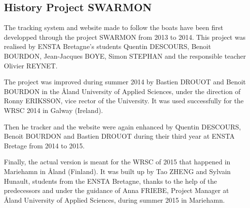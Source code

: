 \subsection{History Project SWARMON}
The tracking system and website made to follow the boats have been first developped through the project SWARMON from 2013 to 2014. This project was realised by ENSTA Bretagne's students Quentin DESCOURS, Benoit BOURDON, Jean-Jacques BOYE, Simon STEPHAN and the responsible teacher Olivier REYNET. 

The project was improved during summer 2014 by Bastien DROUOT and Benoit BOURDON in the Åland University of Applied Sciences, under the direction of Ronny ERIKSSON, vice rector of the University. It was used successfully for the WRSC 2014 in Galway (Ireland).

Then he tracker and the website were again enhanced by Quentin DESCOURS, Benoit BOURDON and Bastien DROUOT during their third year at ENSTA Bretage from 2014 to 2015.

Finally, the actual version is meant for the WRSC of 2015 that happened in Mariehamn in Åland (Finland). It was built up by Tao ZHENG and Sylvain Hunault, students from the ENSTA Bretagne, thanks to the help of the predecessors and under the guidance of Anna FRIEBE, Project Manager at Åland University of Applied Sciences, during summer 2015 in Mariehamn. 